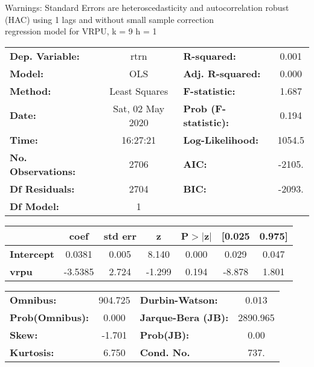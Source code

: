 Warnings: \newline
 [1] Standard Errors are heteroscedasticity and autocorrelation robust (HAC) using 1 lags and without small sample correction\\ 

regression model for VRPU, k = 9 h = 1\begin{center}
\begin{tabular}{lclc}
\toprule
\textbf{Dep. Variable:}    &       rtrn       & \textbf{  R-squared:         } &     0.001   \\
\textbf{Model:}            &       OLS        & \textbf{  Adj. R-squared:    } &     0.000   \\
\textbf{Method:}           &  Least Squares   & \textbf{  F-statistic:       } &     1.687   \\
\textbf{Date:}             & Sat, 02 May 2020 & \textbf{  Prob (F-statistic):} &    0.194    \\
\textbf{Time:}             &     16:27:21     & \textbf{  Log-Likelihood:    } &    1054.5   \\
\textbf{No. Observations:} &        2706      & \textbf{  AIC:               } &    -2105.   \\
\textbf{Df Residuals:}     &        2704      & \textbf{  BIC:               } &    -2093.   \\
\textbf{Df Model:}         &           1      & \textbf{                     } &             \\
\bottomrule
\end{tabular}
\begin{tabular}{lcccccc}
                   & \textbf{coef} & \textbf{std err} & \textbf{z} & \textbf{P$> |$z$|$} & \textbf{[0.025} & \textbf{0.975]}  \\
\midrule
\textbf{Intercept} &       0.0381  &        0.005     &     8.140  &         0.000        &        0.029    &        0.047     \\
\textbf{vrpu}      &      -3.5385  &        2.724     &    -1.299  &         0.194        &       -8.878    &        1.801     \\
\bottomrule
\end{tabular}
\begin{tabular}{lclc}
\textbf{Omnibus:}       & 904.725 & \textbf{  Durbin-Watson:     } &    0.013  \\
\textbf{Prob(Omnibus):} &   0.000 & \textbf{  Jarque-Bera (JB):  } & 2890.965  \\
\textbf{Skew:}          &  -1.701 & \textbf{  Prob(JB):          } &     0.00  \\
\textbf{Kurtosis:}      &   6.750 & \textbf{  Cond. No.          } &     737.  \\
\bottomrule
\end{tabular}
\end{center}


